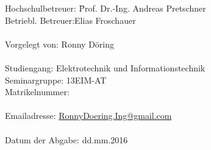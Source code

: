 \begin{spacing}{1.3}
	\begin{tabbing}
	Hochschulbetreuer:\hspace*{2.5cm} \= Prof. Dr.-Ing. Andreas Pretschner\\
	Betriebl. Betreuer:\>Elias Froschauer\\
	\ \\
	Vorgelegt von:\> Ronny Döring\\
	\ \\
	Studiengang:\> Elektrotechnik und Informationstechnik\\
	Seminargruppe:\> 13EIM-AT\\
	Matrikelnummer:\\
	\ \\
	Emailadresse:\> \href{mailto:RonnyDoering.Ing@gmail.com}{RonnyDoering.Ing@gmail.com}\\
	\ \\
	Datum der Abgabe:\> dd.mm.2016 \\
	\end{tabbing}

\end{spacing}


